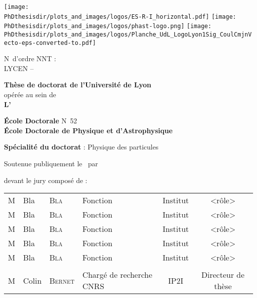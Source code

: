 \thispagestyle{empty}
\begin{center}
\large

\texttt{[image: \\PhDthesisdir/plots\_and\_images/logos/ES-R-I\_horizontal.pdf]}
\hfill
\texttt{[image: \\PhDthesisdir/plots\_and\_images/logos/phast-logo.png]}
\hfill
\texttt{[image: \\PhDthesisdir/plots\_and\_images/logos/Planche\_UdL\_LogoLyon1Sig\_CoulCmjnVecto-eps-converted-to.pdf]}

\begin{flushleft}
N\degree\ d'ordre NNT : \\
LYCEN -- 
\end{flushleft}

\vspace{5mm}

{\LARGE \textbf{Thèse de doctorat de l'Université de Lyon}}\\
opérée au sein de\\
\textbf{L'\insertinstitute}

\vspace{.75cm}

\textbf{École Doctorale} N\degree\ 52\\
\textbf{École Doctorale de Physique et d'Astrophysique}

\vspace{.75cm}

\textbf{Spécialité du doctorat} : Physique des particules

\vspace{1.25cm}

Soutenue publiquement le \insertdate\ par

\vspace{.75cm}

{\LARGE \textbf{\insertauthor}}

\vspace{1.25cm}

\textbf{\huge\inserttitle}

\vfill
devant le jury composé de :

\vspace{.25cm}

\begin{tabular}{llllcc}
M & Bla & \textsc{Bla} & Fonction & Institut & <rôle>\\
M & Bla & \textsc{Bla} & Fonction & Institut & <rôle>\\
M & Bla & \textsc{Bla} & Fonction & Institut & <rôle>\\
M & Bla & \textsc{Bla} & Fonction & Institut & <rôle>\\
M & Bla & \textsc{Bla} & Fonction & Institut & <rôle>\\
\\
M & Colin & \textsc{Bernet} & Chargé de recherche CNRS & IP2I & Directeur de thèse\\
\end{tabular}


\end{center}

